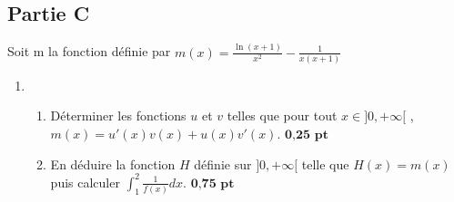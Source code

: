 \documentclass[12pt]{article}
\begin{document}
\subsection*{\centering Partie C}
Soit m la fonction définie par $m(x)=\frac{\ln(x+1)}{x^{2}}-\frac{1}{x(x+1)}$
\begin{enumerate}
\item
\begin{enumerate}
\item[a.] Déterminer les fonctions $u$ et $v$ telles que pour tout $x \in ]0, +\infty[$ ,\\ $m(x) = u'(x)v(x)+u(x)v'(x)$. $\textbf{0,25 pt}$
\item[b.] En déduire la fonction $H$ définie sur $]0, +\infty[$ telle que $H (x) = m(x)$ puis calculer 
$\int_{1}^{2}\frac{1}{f(x)}dx$.$\textbf{ 0,75 pt}$
\end{enumerate}
\end{enumerate}
\end{document}
